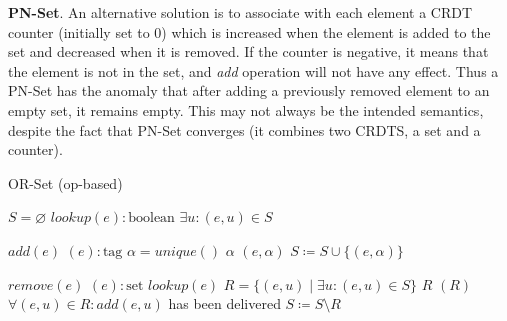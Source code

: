 \textbf{PN-Set}. An alternative solution is to associate with each element a
CRDT counter (initially set to 0) which is increased when the element is added
to the set and decreased when it is removed. If the counter is negative, it
means that the element is not in the set, and \textit{add} operation will not
have any effect. Thus a PN-Set has the anomaly that after adding a previously
removed element to an empty set, it remains empty. This may not always be the
intended semantics, despite the fact that PN-Set converges (it combines two
CRDTS, a set and a counter).

\begin{algorithm}[t]
\small{
	\caption{OR-Set (op-based)}
 	\label{alg:or_set_op_based}                       

 	\begin{algorithmic}[1]
 	  \State \Payload $S = \varnothing$
 	  \State \Query $lookup(e) : \text{boolean}$
 	  \State \hspace{\algorithmicindent} \Return $\exists u : (e, u) \in S$
 	  
 	  \State \Update $add(e)$
 	  \State \hspace{\algorithmicindent} \Prepare $(e) : \text{tag}$
 	  \State \hspace{\algorithmicindent}\hspace{\algorithmicindent} \Let $\alpha = unique()$
 	  \State \hspace{\algorithmicindent}\hspace{\algorithmicindent} \Return $\alpha$
 	  \State \hspace{\algorithmicindent} \Effect $(e, \alpha)$ 
 	  \State \hspace{\algorithmicindent}\hspace{\algorithmicindent} $S \coloneqq S \cup \{(e, \alpha)\}$
 	  
 	  \State \Update $remove(e)$
 	  \State \hspace{\algorithmicindent} \Prepare $(e) : \text{set}$
 	  \State \hspace{\algorithmicindent}\hspace{\algorithmicindent} \Pre $lookup(e)$
 	  \State \hspace{\algorithmicindent}\hspace{\algorithmicindent} \Let $R = \{(e, u) \mid \exists u : (e, u) \in S\}$
 	  \State \hspace{\algorithmicindent}\hspace{\algorithmicindent} \Return $R$
 	  \State \hspace{\algorithmicindent} \Effect $(R)$ 
 	  \State \hspace{\algorithmicindent}\hspace{\algorithmicindent} \Pre $\forall (e, u) \in R : add(e, u)$ has been delivered
 	  \State \hspace{\algorithmicindent}\hspace{\algorithmicindent} $S \coloneqq S \setminus R$
	\end{algorithmic}
 }
\end{algorithm}

